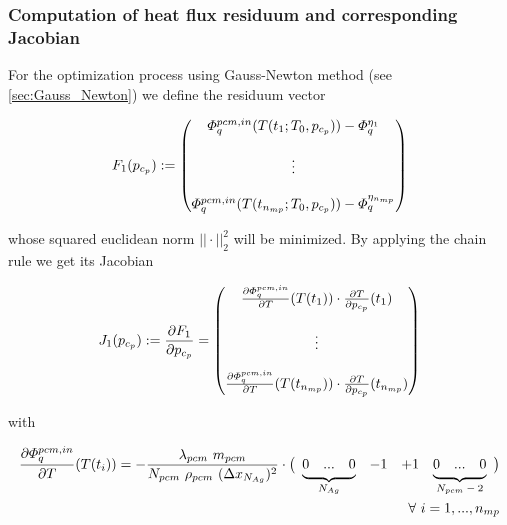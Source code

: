 \documentclass{scrartcl}[12pt, halfparskip]
\numberwithin{equation}{section}
\numberwithin{figure}{section}
\numberwithin{table}{section}
\newcommand\undermat[2]{%
	\makebox[0pt][l]{$\smash{\underbrace{\phantom{%
					\begin{matrix}#2\end{matrix}}}_{\text{$#1$}}}$}#2}
\begin{document}
\subsubsection{Computation of heat flux residuum and corresponding Jacobian}

For the optimization process using Gauss-Newton method (see \cref{sec:Gauss_Newton}) we define the residuum vector 

\begin{equation}
	F_1(p_{c_p}) :=
	\begin{pmatrix}
		\varPhi_{q}^{pcm,in}(T(t_1;T_0,p_{c_p})) - \varPhi_q^{\eta_1} \\
		\textcolor{white}{} \\
		\vdots \\
		\textcolor{white}{} \\
		\varPhi_{q}^{pcm,in}(T(t_{n_{mp}};T_0,p_{c_p})) - \varPhi_q^{\eta_{n_{mp}}}
	\end{pmatrix}
\end{equation}

whose squared euclidean norm $|| \cdot ||_2^2$ will be minimized. 
By applying the chain rule we get its Jacobian

\begin{equation}
	J_1(p_{c_p}) := \frac{\partial F_1}{\partial p_{c_p}} =
	\begin{pmatrix}
		\frac{\partial \varPhi_{q}^{pcm,in}}{\partial T}(T(t_1)) \cdot \frac{\partial T}{\partial p_{c_p}}(t_1) \\
		\textcolor{white}{} \\
		\vdots \\
		\textcolor{white}{} \\
		\frac{\partial \varPhi_{q}^{pcm,in}}{\partial T}(T(t_{n_{mp}})) \cdot \frac{\partial T}{\partial p_{c_p}}(t_{n_{mp}}) \\
	\end{pmatrix}
	\label{eq:optimization_jacobian}
\end{equation}

with

\begin{align}
	\frac{\partial \varPhi_{q}^{pcm,in}}{\partial T}(T(t_i)) = - \frac{\lambda_{pcm} \ m_{pcm}}{N_{pcm} \ \rho_{pcm} \ (\Delta x_{N_{Ag}})^2} \cdot
	\left(\begin{array}{cccccccc}
	\undermat{N_{Ag}}{0 & ... & 0} & -1 & +1 & \undermat{N_{pcm}-2}{0 & ... & 0}
	\end{array}\right) \\[2ex]
	\forall \ i = 1,...,n_{mp} \nonumber
\end{align}
\end{document}
